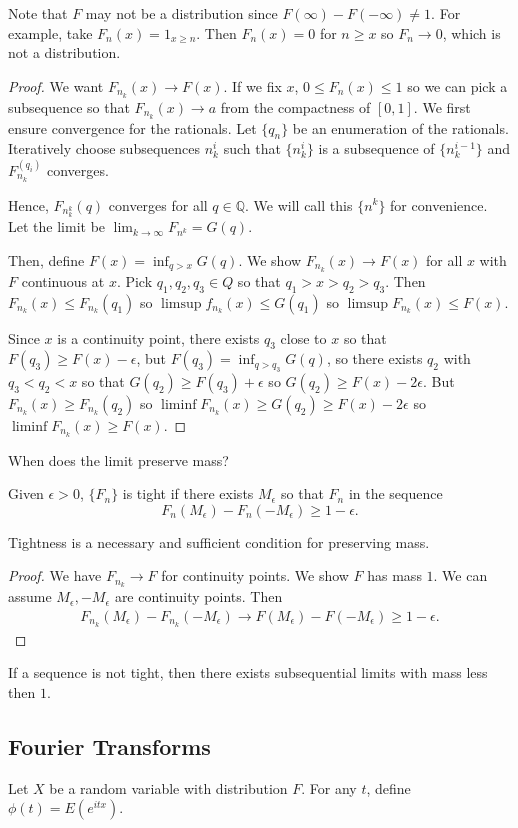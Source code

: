 \documentclass[11pt]{scrartcl}
\newcommand{\Q}{\mathbb{Q}}
\begin{document}
Note that $F$ may not be a distribution since $F(\infty) - F(-\infty) \ne 1$.  For example, take $F_n(x) = 1_{x \ge n}$.  Then $F_n(x) = 0$ for $n \ge x$ so $F_n \rightarrow 0$, which is not a distribution.
\begin{proof}
We want $F_{n_k}(x) \rightarrow F(x)$.  If we fix $x$, $0 \le F_n(x) \le 1$ so we can pick a subsequence so that $F_{n_k}(x) \rightarrow a$ from the compactness of $[0, 1]$.  We first ensure convergence for the rationals.  Let $\{q_n\}$ be an enumeration of the rationals.  Iteratively choose subsequences $n_k^i$ such that $\{n_k^i\}$ is a subsequence of $\{n_k^{i-1}\}$ and $F_{n_k}^(q_i)$ converges.  

Hence, $F_{n_k^k}(q)$ converges for all $q \in \Q$.  We will call this $\{n^k\}$ for convenience.  Let the limit be $\lim_{k\to \infty} F_{n^k} = G(q)$.

Then, define $F(x) = \inf_{q > x} G(q)$.    We show $F_{n_k}(x) \rightarrow F(x)$ for all $x$ with $F$ continuous at $x$.  Pick $q_1, q_2, q_3\in Q$ so that $q_1 >x > q_2 > q_3$.   Then $F_{n_k}(x) \le F_{n_k}(q_1)$ so $\limsup f_{n_k}(x) \le G(q_1)$ so $\limsup F_{n_k}(x) \le F(x)$. 

Since $x$ is a continuity point, there exists $q_3$ close to $x$ so that $F(q_3) \ge F(x) - \epsilon$, but $F(q_3) = \inf_{q > q_3} G(q)$, so there exists $q_2$ with $q_3 < q_2 < x$ so that $G(q_2) \ge F(q_3) + \epsilon$ so $G(q_2) \ge F(x) - 2\epsilon$.  But $F_{n_k}(x) \ge F_{n_k}(q_2)$ so $\liminf F_{n_k}(x) \ge G(q_2) \ge F(x) - 2\epsilon$ so $\liminf F_{n_k}(x) \ge F(x)$.
\end{proof}
When does the limit preserve mass?  
\begin{definition} Given $\epsilon > 0$, $\{F_n\}$ is tight if there exists $M_\epsilon$ so that $F_n$ in the sequence 
$$F_n(M_\epsilon) - F_n(-M_{\epsilon}) \ge 1-\epsilon.$$
\end{definition}
Tightness is a necessary and sufficient condition for preserving mass.
\begin{proof}
We have $F_{n_k} \rightarrow F$ for continuity points.  We show $F$ has mass $1$.  We can assume $M_\epsilon, -M_\epsilon$ are continuity points.  Then 
\begin{align*}
F_{n_k}(M_\epsilon) - F_{n_k}(-M_\epsilon) \to F(M_\epsilon) - F(-M_\epsilon) \ge 1 - \epsilon.
\end{align*}
\end{proof}
If a sequence is not tight, then there exists subsequential limits with mass less then $1$.
\subsection{Fourier Transforms}
Let $X$ be a random variable with distribution $F$.  For any $t$, define $\phi(t) = E(e^{itx})$.  
\end{document}
